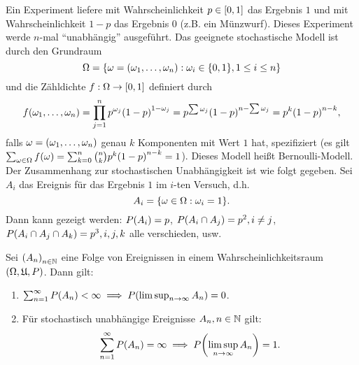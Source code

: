\documentclass{lecture}
\begin{document}
    \begin{example}
        Ein Experiment liefere mit Wahrscheinlichkeit \(p \in \brackets*{0, 1}\) das Ergebnis \(1\) und mit Wahrscheinlichkeit \(1 - p\) das Ergebnis \(0\) (z.B. ein Münzwurf).
        Dieses Experiment werde \(n\)-mal ``unabhängig'' ausgeführt.
        Das geeignete stochastische Modell ist durch den Grundraum
        \[
            \Omega = \braces*{\omega = \parentheses*{\omega_1, \ldots, \omega_n} : \omega_i \in \braces*{0, 1}, 1 \le i \le n}
        \]
        und die Zähldichte \(f: \Omega \to \brackets*{0, 1}\) definiert durch
        \[
            f\parentheses*{\omega_1, \ldots, \omega_n} = \prod_{j = 1}^n p^{\omega_j}\parentheses*{1 - p}^{1 - \omega_j} = p^{\sum\omega_j}\parentheses*{1 - p}^{n - \sum\omega_j} = p^k\parentheses*{1 - p}^{n - k},
        \]
        falls \(\omega = \parentheses*{\omega_1, \ldots, \omega_n}\) genau \(k\) Komponenten mit Wert \(1\) hat, spezifiziert (es gilt \(\sum_{\omega \in \Omega}f\parentheses*{\omega} = \sum_{k = 0}^n\binom{n}{k}p^k\parentheses*{1 - p}^{n - k} = 1\)).
        Dieses Modell heißt Bernoulli-Modell.
        Der Zusammenhang zur stochastischen Unabhängigkeit ist wie folgt gegeben.
        Sei \(A_i\) das Ereignis für das Ergebnis \(1\) im \(i\)-ten Versuch, d.h.
        \[
            A_i = \braces*{\omega \in \Omega : \omega_i = 1}.
        \]
        Dann kann gezeigt werden: \(P\parentheses*{A_i} = p\), \(P\parentheses*{A_i \cap A_j} = p^2, i \ne j\), \(P\parentheses*{A_i \cap A_j \cap A_k} = p^3, i, j, k\) alle verschieden, usw.
    \end{example}

    \begin{lemma}
        Sei \(\parentheses*{A_n}_{n \in \N}\) eine Folge von Ereignissen in einem Wahrscheinlichkeitsraum \(\parentheses*{\Omega, \mathfrak{U}, P}\).
        Dann gilt:
        \begin{enumerate}
            \item \(\sum_{n = 1}^\infty P\parentheses*{A_n} < \infty \implies P\parentheses*{\limsup_{n \to \infty}A_n} = 0\).
            \item Für stochastisch unabhängige Ereignisse \(A_n, n \in \N\) gilt:
            \[
                \sum_{n = 1}^\infty P\parentheses*{A_n} = \infty \implies P\parentheses*{\limsup_{n \to \infty}A_n} = 1.
            \]
        \end{enumerate}
    \end{lemma}
\end{document}
